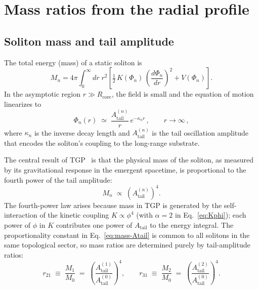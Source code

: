 \documentclass[11pt,a4paper]{article}
\newcommand{\Atail}{A_{\mathrm{tail}}}
\begin{document}
\section{Mass ratios from the radial profile}\label{sec:massratios}

\subsection{Soliton mass and tail amplitude}

The total energy (mass) of a static soliton is
\begin{equation}\label{eq:solitonmass}
  M_n = 4\pi \int_0^\infty dr\;r^2\left[
    \tfrac{1}{2}\,K(\Phi_n)\,\left(\frac{d\Phi_n}{dr}\right)^{\!2}
    + V(\Phi_n)
  \right].
\end{equation}
In the asymptotic region $r \gg R_{\mathrm{core}}$, the field is
small and the equation of motion linearizes to
\begin{equation}\label{eq:linear-tail}
  \Phi_n(r) \;\simeq\; \frac{\Atail^{(n)}}{r}\,e^{-\kappa_n r}\,,
  \qquad r \to \infty\,,
\end{equation}
where $\kappa_n$ is the inverse decay length and $\Atail^{(n)}$ is
the tail oscillation amplitude that encodes the soliton's coupling
to the long-range substrate.

The central result of TGP~\cite{Serafin2026-full} is that the
physical mass of the soliton, as measured by its gravitational
response in the emergent spacetime, is proportional to the fourth
power of the tail amplitude:
\begin{equation}\label{eq:mass-Atail}
  M_n \;\propto\; \left(\Atail^{(n)}\right)^{4}.
\end{equation}
The fourth-power law arises because mass in TGP is generated by
the self-interaction of the kinetic coupling $K \propto \phi^4$
(with $\alpha=2$ in Eq.~\eqref{eq:Kphi}); each power of $\phi$
in $K$ contributes one power of $\Atail$ to the energy integral.
The proportionality constant in Eq.~\eqref{eq:mass-Atail} is common
to all solitons in the same topological sector, so mass ratios are
determined purely by tail-amplitude ratios:
\begin{equation}\label{eq:ratio-formula}
  r_{21} \;\equiv\; \frac{M_1}{M_0}
  \;=\; \left(\frac{\Atail^{(1)}}{\Atail^{(0)}}\right)^{\!4},
  \qquad
  r_{31} \;\equiv\; \frac{M_2}{M_0}
  \;=\; \left(\frac{\Atail^{(2)}}{\Atail^{(0)}}\right)^{\!4}.
\end{equation}
\end{document}
